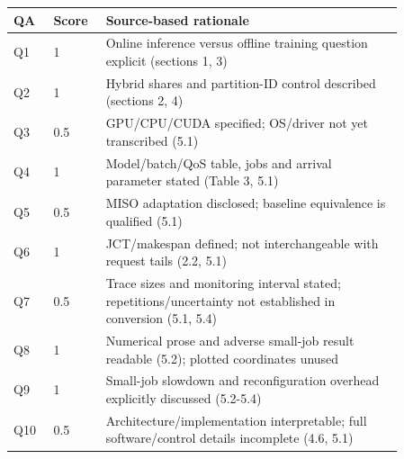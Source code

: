 \begin{longtable}{P{0.09\linewidth}P{0.10\linewidth}P{0.67\linewidth}}
\toprule QA & Score & Source-based rationale\\\midrule\endhead
Q1 & 1 & Online inference versus offline training question explicit (sections 1, 3)\\
Q2 & 1 & Hybrid shares and partition-ID control described (sections 2, 4)\\
Q3 & 0.5 & GPU/CPU/CUDA specified; OS/driver not yet transcribed (5.1)\\
Q4 & 1 & Model/batch/QoS table, jobs and arrival parameter stated (Table 3, 5.1)\\
Q5 & 0.5 & MISO adaptation disclosed; baseline equivalence is qualified (5.1)\\
Q6 & 1 & JCT/makespan defined; not interchangeable with request tails (2.2, 5.1)\\
Q7 & 0.5 & Trace sizes and monitoring interval stated; repetitions/uncertainty not established in conversion (5.1, 5.4)\\
Q8 & 1 & Numerical prose and adverse small-job result readable (5.2); plotted coordinates unused\\
Q9 & 1 & Small-job slowdown and reconfiguration overhead explicitly discussed (5.2-5.4)\\
Q10 & 0.5 & Architecture/implementation interpretable; full software/control details incomplete (4.6, 5.1)\\
\bottomrule\end{longtable}

